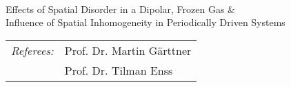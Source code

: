 \begin{titlepage}
    \begin{addmargin}[-1cm]{-3cm}
    \begin{center}
        \large

        \hfill

        \vfill

        \begingroup
            \color{CTtitle} \\ \bigskip\bigskip
        Effects of Spatial Disorder in a Dipolar, Frozen Gas \&\\
        Influence of Spatial Inhomogeneity in Periodically Driven Systems
        \endgroup

        \vfill

    \end{center}
    \vfill
    \begin{center}
        \begin{tabular}{ll}
             \textit{Referees:}\hspace{0.5cm} & Prof. Dr. Martin Gärttner\\
             & Prof. Dr. Tilman Enss
        \end{tabular}
    \end{center}
  \end{addmargin}
\end{titlepage}

